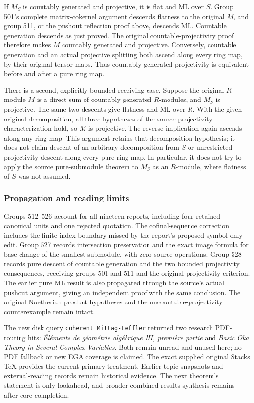 If \(M_S\) is countably generated and projective, it is flat and ML over \(S\). Group 501's complete matrix-cokernel argument descends flatness to the original \(M\), and group 511, or the pushout reflection proof above, descends ML. Countable generation descends as just proved. The original countable-projectivity proof therefore makes \(M\) countably generated and projective. Conversely, countable generation and an actual projective splitting both ascend along every ring map, by their original tensor maps. Thus countably generated projectivity is equivalent before and after a pure ring map.

There is a second, explicitly bounded receiving case. Suppose the original \(R\)-module \(M\) is a direct sum of countably generated \(R\)-modules, and \(M_S\) is projective. The same two descents give flatness and ML over \(R\). With the given original decomposition, all three hypotheses of the source projectivity characterization hold, so \(M\) is projective. The reverse implication again ascends along any ring map. This argument retains that decomposition hypothesis; it does not claim descent of an arbitrary decomposition from \(S\) or unrestricted projectivity descent along every pure ring map. In particular, it does not try to apply the source pure-submodule theorem to \(M_S\) as an \(R\)-module, where flatness of \(S\) was not assumed.

\subsubsection{Propagation and reading limits}\label{algebra-proof-013-propagation-and-reading-limits}

Groups 512--526 account for all nineteen reports, including four retained canonical units and one rejected quotation. The cofinal-sequence correction includes the finite-index boundary missed by the report's proposed symbol-only edit. Group 527 records intersection preservation and the exact image formula for base change of the smallest submodule, with zero source operations. Group 528 records pure descent of countable generation and the two bounded projectivity consequences, receiving groups 501 and 511 and the original projectivity criterion. The earlier pure ML result is also propagated through the source's actual pushout argument, giving an independent proof with the same conclusion. The original Noetherian product hypotheses and the uncountable-projectivity counterexample remain intact.

The new disk query \texttt{coherent\ Mittag-Leffler} returned two research PDF-routing hits: \emph{Éléments de géométrie algébrique III, première partie} and \emph{Basic Oka Theory in Several Complex Variables}. Both remain unread and unused here; no PDF fallback or new EGA coverage is claimed. The exact supplied original Stacks TeX provides the current primary treatment. Earlier topic snapshots and external-reading records remain historical evidence. The next theorem's statement is only lookahead, and broader combined-results synthesis remains after core completion.
